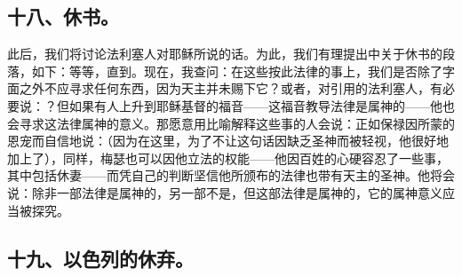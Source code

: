 
\subsection{十八、休书。}

此后，我们将讨论法利塞人对耶稣所说的话。为此，我们有理提出中关于休书的段落，如下：等等，直到。现在，我查问：在这些按此法律的事上，我们是否除了字面之外不应寻求任何东西，因为天主并未赐下它？或者，对引用的法利塞人，有必要说：？但如果有人上升到耶稣基督的福音——这福音教导法律是属神的——他也会寻求这法律属神的意义。那愿意用比喻解释这些事的人会说：正如保禄因所蒙的恩宠而自信地说：（因为在这里，为了不让这句话因缺乏圣神而被轻视，他很好地加上了），同样，梅瑟也可以因他立法的权能——他因百姓的心硬容忍了一些事，其中包括休妻——而凭自己的判断坚信他所颁布的法律也带有天主的圣神。他将会说：除非一部法律是属神的，另一部不是，但这部法律是属神的，它的属神意义应当被探究。\par


\subsection{十九、以色列的休弃。}

